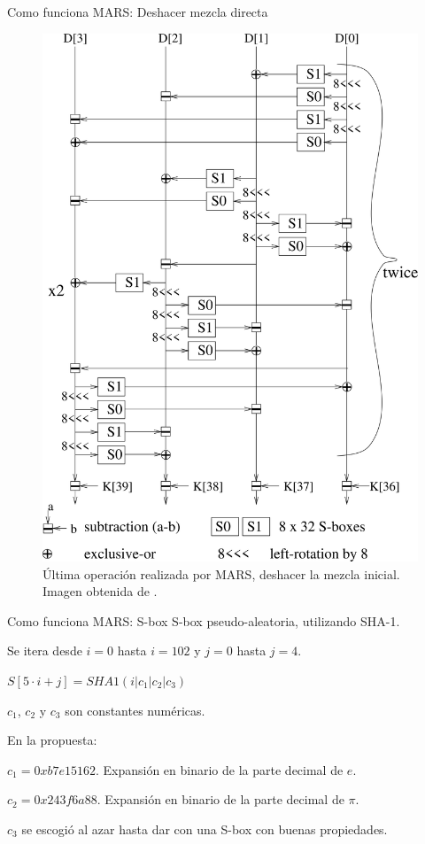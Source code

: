 \documentclass{beamer}
\begin{document}
\begin{frame}{Como funciona MARS: Deshacer mezcla directa}
	\begin{figure}[H]
		\centering
		\includegraphics[scale = 0.38]{deshacer_mezcla.png}
		\caption{Última operación realizada por MARS, deshacer la mezcla inicial. Imagen obtenida de \cite{ampliacionPropuestaMARS}.} \label{fig:undo_mezcla_directa}
	\end{figure}
\end{frame}


\begin{frame}{Como funciona MARS: S-box}
	S-box pseudo-aleatoria, utilizando SHA-1.

	Se itera desde $i = 0$ hasta $i = 102$ y $j = 0$ hasta $j = 4$.

	$S[5 \cdot i + j] = SHA1(i | c_1 | c_2 | c_3)$

	$c_1$, $c_2$ y $c_3$ son constantes numéricas.

	En la propuesta:

	$c_1 = 0xb7e15162$. Expansión en binario de la parte decimal de $e$.

	$c_2 = 0x243f6a88$. Expansión en binario de la parte decimal de $\pi$.

	$c_3$ se escogió al azar hasta dar con una S-box con buenas propiedades.

\end{frame}
\end{document}
